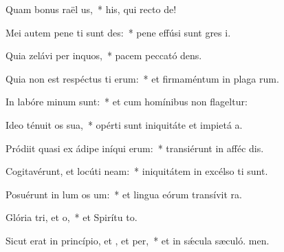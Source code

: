 \item Quam bonus raël us,~* his, qui recto  de!
\item Mei autem pene ti sunt des:~* pene effúsi sunt gres i.
\item Quia zelávi per inquos,~* pacem peccató dens.
\item Quia non est respéctus ti erum:~* et firmaméntum in plaga rum.
\item In labóre minum  sunt:~* et cum homínibus non flageltur:
\item Ideo ténuit os sua,~* opérti sunt iniquitáte et impietá a.
\item Pródiit quasi ex ádipe iníqui erum:~* transiérunt in afféc dis.
\item Cogitavérunt, et locúti  neam:~* iniquitátem in excélso ti sunt.
\item Posuérunt in lum os um:~* et lingua eórum transívit  ra.
\item Glória tri, et o,~* et Spirítu to.
\item Sicut erat in princípio, et , et per,~* et in sǽcula sæculó. men.
